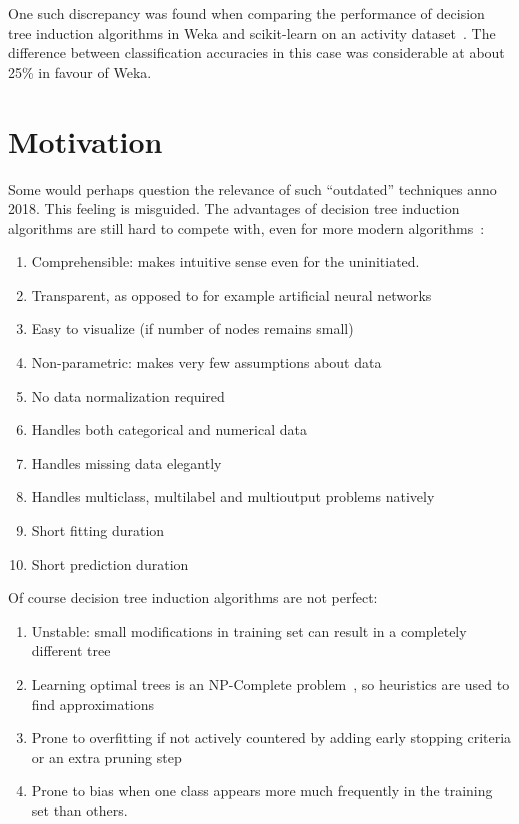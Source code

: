 One such discrepancy was found when comparing the performance of decision tree induction algorithms in Weka and scikit-learn on an activity dataset~\cite{problematic_dataset}. The difference between classification accuracies in this case was considerable at about 25\% in favour of Weka.

\section{Motivation}
Some would perhaps question the relevance of such ``outdated'' techniques anno 2018. This feeling is misguided. The advantages of decision tree induction algorithms are still hard to compete with, even for more modern algorithms~\cite{scikit-learn, murthy1998automatic, kotsiantis2007supervised}:

\begin{enumerate}
    \item Comprehensible: makes intuitive sense even for the uninitiated.
    \item Transparent, as opposed to for example artificial neural networks
    \item Easy to visualize (if number of nodes remains small)
    \item Non-parametric: makes very few assumptions about data
    \item No data normalization required
    \item Handles both categorical and numerical data
    \item Handles missing data elegantly %
    \item Handles multiclass, multilabel and multioutput problems natively
    \item Short fitting duration
    \item Short prediction duration
\end{enumerate}

Of course decision tree induction algorithms are not perfect:
\begin{enumerate}
    \item Unstable: small modifications in training set can result in a completely different tree
    \item Learning optimal trees is an NP-Complete problem~\cite{npcomplete}, so heuristics are used to find approximations
    \item Prone to overfitting if not actively countered by adding early stopping criteria or an extra pruning step
    \item Prone to bias when one class appears more much frequently in the training set than others.
\end{enumerate}

